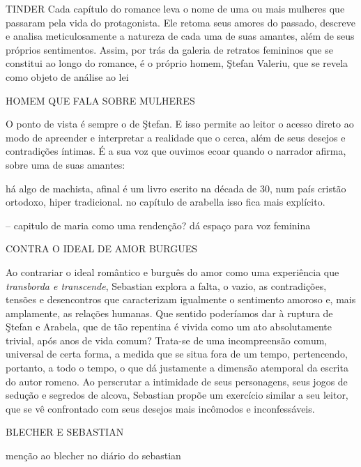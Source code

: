 
TINDER
Cada capítulo do romance leva o nome de uma ou mais mulheres que passaram
pela vida do protagonista. Ele retoma seus amores do passado,
descreve e analisa meticulosamente a natureza de cada uma de suas
amantes, além de seus próprios sentimentos.
Assim, por trás da galeria de retratos femininos que se constitui ao
longo do romance, é o próprio homem, Ştefan Valeriu, que se revela como
objeto de análise ao lei


HOMEM QUE FALA SOBRE MULHERES

O ponto de vista é sempre o de Ştefan. E isso permite ao leitor o acesso direto ao modo de
apreender e interpretar a realidade que o cerca, além de seus desejos
e contradições íntimas. É a sua voz que ouvimos ecoar quando
o narrador afirma, sobre uma de suas amantes:

há algo de machista, afinal é um livro escrito na década de 30, num país cristão ortodoxo, hiper tradicional.
no capítulo de arabella isso fica mais explícito.

-- capitulo de maria como uma rendenção? dá espaço para voz feminina



CONTRA O IDEAL DE AMOR BURGUES


Ao contrariar o ideal romântico e burguês do amor como uma experiência
que \textit{transborda e transcende}, Sebastian explora a falta, o vazio, as
contradições, tensões e desencontros que caracterizam igualmente o
sentimento amoroso e, mais amplamente, as relações humanas. Que sentido
poderíamos dar à ruptura de Ştefan e Arabela, que de tão repentina é
vivida como um ato absolutamente trivial, após anos de vida comum?
Trata-se de uma incompreensão comum, universal de certa forma, a medida
que se situa fora de um tempo, pertencendo, portanto, a todo o tempo, o
que dá justamente a dimensão atemporal da escrita do autor romeno. Ao
perscrutar a intimidade de seus personagens, seus jogos de sedução e
segredos de alcova, Sebastian propõe um exercício similar a seu
leitor, que se vê confrontado com seus desejos mais incômodos e
inconfessáveis.


BLECHER E SEBASTIAN

menção ao blecher no diário do sebastian